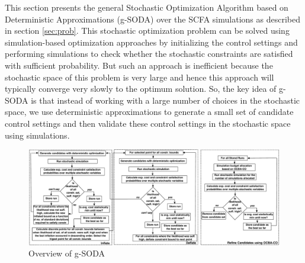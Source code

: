 \documentclass[a4paper, 12pt]{article} %
\begin{document}
This section presents the general Stochastic Optimization Algorithm based on Deterministic Approximations (g-SODA) over the SCFA simulations as described in section \ref{sec:prob}. 
This stochastic optimization problem can be solved using simulation-based optimization approaches by initializing the control settings and performing simulations to check whether the stochastic constraints are satisfied with sufficient probability.
But such an approach is inefficient because the stochastic space of this problem is very large and hence this approach will typically converge very slowly to the optimum solution.
So, the key idea of g-SODA is that instead of working with a large number of choices in the stochastic space, we use deterministic approximations to generate a small set of candidate control settings and then validate these control settings in the stochastic space using simulations.


\begin{figure}[t]
	\includegraphics[width=\textwidth]{images/Algo_Full.pdf}
	\caption{Overview of g-SODA}
	\label{fig:algoOverview}       %
\end{figure}


\newcommand{\algoSODAm}{Algorithm 1}
\newcommand{\algoInflDefl}{Algorithm 2}
\newcommand{\algoPerfInfl}{Algorithm 3}
\newcommand{\algoInflate}{Algorithm 4}
\newcommand{\algoPerfDefl}{Algorithm 5}
\newcommand{\algoDeflate}{Algorithm 6}
\newcommand{\algoRefineCand}{Algorithm 7}
\newcommand{\algoExOCBA}{Algorithm 8}
\newcommand{\algoStochSim}{Algorithm 9}
\end{document}
